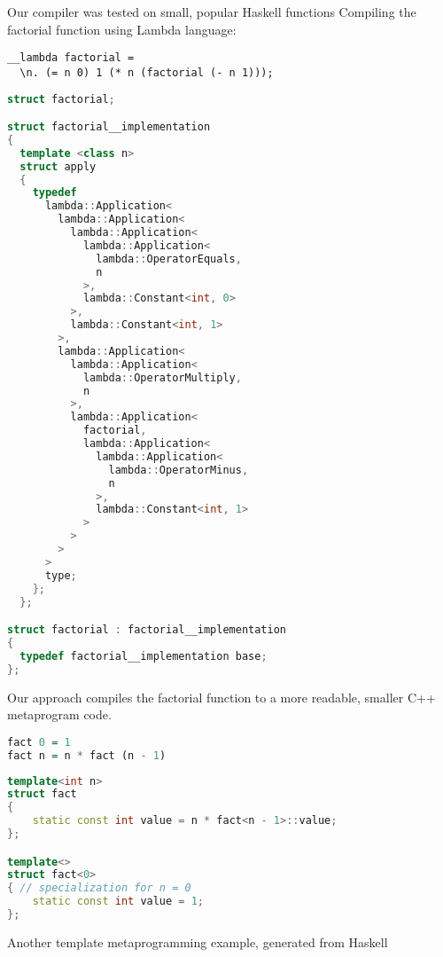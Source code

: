 \documentclass{article}
\begin{document}
\begin{comment}
HASKELL CODE\\
\centerline{\Bigg\Downarrow}
C++ CODE
\end{comment}
Our compiler was tested on small, popular Haskell functions\cite{bartoszhaskell}
Compiling the factorial function using Lambda language:
\begin{center}
\begin{lstlisting}
__lambda factorial =
  \n. (= n 0) 1 (* n (factorial (- n 1)));
\end{lstlisting}
\Bigg\Downarrow
\begin{lstlisting}[language=C++]
struct factorial;

struct factorial__implementation
{
  template <class n>
  struct apply
  {
    typedef
      lambda::Application<
        lambda::Application<
          lambda::Application<
            lambda::Application<
              lambda::OperatorEquals,
              n
            >,
            lambda::Constant<int, 0>
          >,
          lambda::Constant<int, 1>
        >,
        lambda::Application<
          lambda::Application<
            lambda::OperatorMultiply,
            n
          >,
          lambda::Application<
            factorial,
            lambda::Application<
              lambda::Application<
                lambda::OperatorMinus,
                n
              >,
              lambda::Constant<int, 1>
            >
          >
        >
      >
      type;
    };
  };

struct factorial : factorial__implementation
{
  typedef factorial__implementation base;
};
\end{lstlisting}
\end{center}
Our approach compiles the factorial function to a more readable, smaller C++ metaprogram code.
\begin{center}
\begin{lstlisting}[language=Haskell]
fact 0 = 1
fact n = n * fact (n - 1)
\end{lstlisting}
\Bigg\Downarrow
\begin{lstlisting}[language=C++]
template<int n> 
struct fact 
{
    static const int value = n * fact<n - 1>::value;
};

template<> 
struct fact<0>
{ // specialization for n = 0
    static const int value = 1;
};
\end{lstlisting}
\end{center}
Another template metaprogramming example, generated from Haskell
\end{document}
